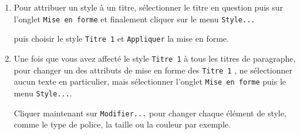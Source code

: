 \begin{enumerate}
\item Pour attribuer un style à un titre, sélectionner le titre en question  puis sur l'onglet \texttt{Mise en forme}   et finalement cliquer sur le menu \texttt{Style...}  




puis choisir le style \texttt{Titre 1}  et \texttt{Appliquer}  la mise en forme.


\item Une fois que vous avez affecté le style \texttt{Titre 1} à tous les titres de paragraphe, pour changer un des attributs de mise en forme des \texttt{Titre 1} , ne sélectionner aucun texte en particulier, mais sélectionner l'onglet \texttt{Mise en forme} puis le menu \texttt{Style...}.


Cliquer maintenant sur \texttt{Modifier...}  pour changer chaque élément de style, comme le type de police, la taille ou la couleur par exemple.






\end{enumerate}
